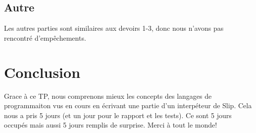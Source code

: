 \documentclass{article}
\begin{document}
\subsection{Autre}
Les autres parties sont similaires aux devoirs 1-3, donc nous n'avons pas rencontré
d'empêchements.
\section{Conclusion}
Grace à ce TP, nous comprenons mieux les concepts des langages de programmaiton
vus en cours en écrivant une partie d'un interpéteur de Slip. Cela nous a pris 5 jours (et un jour pour le rapport et les tests). 
Ce sont 5 jours occupés mais aussi 5 jours remplis de surprise. Merci à tout le monde!



    





\end{document}
